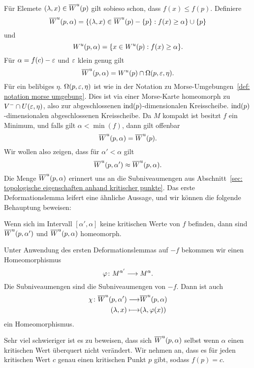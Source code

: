 \begin{bigproof}
    Für Elemete $(\lambda, x) \in { \overline{W}^u } (p)$ gilt sobieso schon, dass $f(x) \leq f(p)$. Definiere
    \[ { \overline{W}^u } (p, \alpha) = 
        \{ (\lambda, x) \in { \overline{W}^u } (p) - \{ p \} : f(x) \geq \alpha \}  \cup \{ p \} \]
    und 
    \[ { W^u } (p, \alpha) = \{ x \in { W^u } (p) : f(x) \geq \alpha \} . \]
    Für $\alpha = f(c) - \varepsilon$ und $\varepsilon$ klein genug gilt 
    \[ { \overline{W}^u } (p, \alpha) = { W^u } (p) \cap \Omega (p, \varepsilon, \eta) . \]
    Für ein belibiges $\eta$. $\Omega (p, \varepsilon, \eta)$ ist wie in der Notation zu 
    Morse-Umgebungen~\ref{def: notation morse umgebung}. Dies ist via einer Morse-Karte homeomorph 
    zu $V^- \cap U(\varepsilon, \eta)$, also zur abgeschlossenen ${ \operatorname{ind} } (p)$-dimensionalen Kreisscheibe.
    ${ \operatorname{ind} } (p)$-dimensionalen abgeschlossenen Kreisscheibe. Da $M$ kompakt ist besitzt $f$ ein 
    Minimum, und falls gilt $\alpha < \min (f)$, dann gilt offenbar
    \[ { \overline{W}^u } (p, \alpha) = { \overline{W}^u } (p) . \]
    Wir wollen also zeigen, dass für $\alpha' < \alpha$ gilt
    \[ { \overline{W}^u } (p, \alpha') \approx { \overline{W}^u } (p, \alpha) . \]
    Die Menge ${ \overline{W}^u } (p, \alpha)$ erinnert uns an die Subniveaumengen aus 
    Abschnitt~\ref{sec: topologische eigenschaften anhand kritischer punkte}. Das erste 
    Deformationslemma leifert eine ähnliche Aussage, und wir können die folgende Behauptung 
    beweisen:

    \begin{claim}
        Wenn sich im Intervall $[\alpha', \alpha]$ keine kritischen Werte von $f$
        befinden, dann sind ${ \overline{W}^u } (p, \alpha')$ und ${ \overline{W}^u } (p, \alpha)$ homeomorph.
    \end{claim}

    \begin{smallproof}
        Unter Anwendung des ersten Deformationslemmas auf $-f$ bekommen wir einen Homeomorphismus
        \[ \varphi \colon M^{\alpha'} \longrightarrow M^{\alpha} . \]
        Die Subniveaumengen sind die Subniveaumengen von $-f$. Dann ist auch 
        \begin{align*}
            \chi \colon { \overline{W}^u } (p, \alpha') \longrightarrow & { \overline{W}^u } (p, \alpha) \\
            (\lambda, x) \longmapsto & (\lambda, \varphi(x))
        \end{align*}
        ein Homeomorphismus.
    \end{smallproof}

    Sehr viel schwieriger ist es zu beweisen, dass sich ${ \overline{W}^u } (p, \alpha)$ selbst wenn $\alpha$
    einen kritischen Wert überquert nicht verändert. Wir nehmen an, dass es für jeden kritischen Wert
    $c$ genau einen kritischen Punkt $p$ gibt, sodass $f (p) = c$. 

    \begin{claim}
        
    \end{claim}
\end{bigproof}